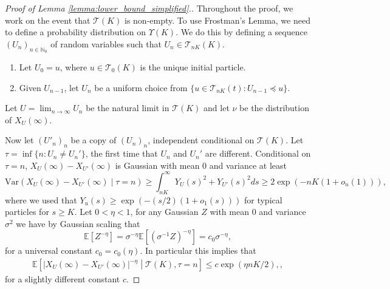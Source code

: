\documentclass{article}
\theoremstyle{definition}
\numberwithin{equation}{section}
\numberwithin{thm}{section}
\newcommand*{\NN}{\ensuremath{\mathbb{N}}}		        %
\newcommand*{\EE}{\ensuremath{\mathbb{E}}}	        	%
\newcommand*{\Var}{\ensuremath{\mathrm{Var}  }}	        %
\begin{document}
\begin{proof}[Proof of Lemma \ref{lemma:lower_bound_simplified}.]
    Throughout the proof, we work on the event that $\mathcal{T}(K)$ is non-empty. 
    To use Frostman's Lemma, we need to define a probability distribution on $\Upsilon(K)$. We do this by defining a sequence $(U_n)_{n\in \NN_0}$ of random variables such that $U_n \in \mathcal{T}_{nK}(K)$.
    \begin{enumerate}
        \item Let $U_0 = u$, where $u\in \mathcal{T}_0(K)$ is the unique initial particle. 
        \item Given $U_{n-1}$, let $U_n$ be a uniform choice from $\{u\in \mathcal{T}_{nK}(t): U_{n-1}\preceq u\}$.
    \end{enumerate}
    Let $U=\lim_{n \to \infty }U_n$ be the natural limit in $\mathcal{T}(K)$ and let $\nu$ be the distribution of $X_U(\infty)$. 

    Now let $(U'_n)_{n}$ be a copy of $(U_n)_{n}$, independent conditional on $\mathcal{T}(K)$. Let $\tau = \inf\{n: U_n\neq U_{n}'\}$, the first time that $U_n$ and $U_n'$ are different. Conditional on $\tau = n$, $X_U(\infty)-X_{U'}(\infty)$ is Gaussian with mean $0$ and variance at least
    \begin{equation*}
        \Var\left(X_U(\infty)-X_{U'}(\infty)\middle\vert \tau =n\right) \geq \int_{nK}^\infty Y_U(s)^2 +Y_{U'}(s)^2 ds \geq 2 \exp\left(-nK(1+o_n(1) )\right),
    \end{equation*}
    where we used that $Y_u(s) \geq \exp(-(s/2)(1+o_1(s)))$ for typical particles for $s\geq K$. Let $0<\eta <1$, for any Gaussian $Z$ with mean $0$ and variance $\sigma^2$ we have by Gaussian scaling that
    \begin{equation*}
        \EE[Z^{-\eta}] = \sigma^{-\eta} \EE[(\sigma^{-1}Z)^{-\eta}] = c_0\sigma^{-\eta},
    \end{equation*}
    for a universal constant $c_0=c_0(\eta)$. In particular this implies that 
    \begin{align}
        \EE\left[\vert X_U(\infty) - X_{U'}(\infty)\vert^{-\eta}\middle\vert \mathcal{T}(K),\tau =n \right]\leq c \exp(\eta nK/2),\label{eq:ce},
    \end{align}
    for a slightly different constant $c$.
    

\end{proof}
\end{document}

